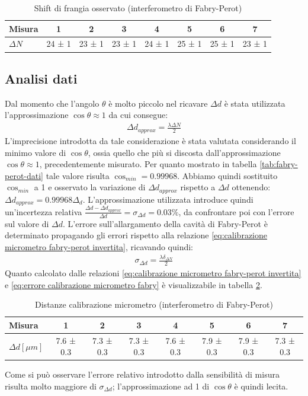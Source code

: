 \documentclass[a4paper]{article}
\begin{document}
\begin{table}[htbp]
\centering
\caption{Shift di frangia osservato (interferometro di Fabry-Perot)}
\begin{tabular}{|l|ccccccc|}
\hline
Misura & 1 & 2 & 3 & 4 & 5 & 6 & 7 \\\hline\hline
$\Delta N$ & 24 ± 1 & 23 ± 1 & 23 ± 1 & 24 ± 1 & 25 ± 1 & 25 ± 1 & 23 ± 1 \\\hline
\end{tabular}
\label{tab: micrometro fabry-perot}
\end{table}

\subsection{Analisi dati}
Dal momento che l'angolo $\theta$ è molto piccolo nel ricavare $\Delta d$ è stata utilizzata l'approssimazione $\cos{\theta}\approx1$ da cui consegue:
\begin{align}
    \Delta d_{approx} = \frac{\lambda \Delta N}{2}
\label{eq:calibrazione micrometro fabry-perot invertita}
\end{align}
L'imprecisione introdotta da tale considerazione è stata valutata considerando il minimo valore di $\cos{\theta}$, ossia quello che più si discosta dall'approssimazione $\cos{\theta}\approx1$, precedentemente misurato. Per quanto mostrato in tabella \ref{tab:fabry-perot-dati} tale valore risulta $\cos_{min}=0.99968$.
Abbiamo quindi sostituito $\cos_{min}$ a 1 e osservato la variazione di $\Delta d_{approx}$ rispetto a $\Delta d$ ottenendo: $\Delta d_{approx} = 0.99968\Delta_d$. L'approssimazione utilizzata introduce quindi un'incertezza relativa $\frac{\Delta d- \Delta d_{approx}}{\Delta d}=\sigma_{\Delta d}=0.03\%$, da confrontare poi con l'errore sul valore di $\Delta d$.
L'errore sull'allargamento della cavità di Fabry-Perot è determinato propagando gli errori rispetto alla relazione \ref{eq:calibrazione micrometro fabry-perot invertita}, ricavando quindi:
\begin{align}
   \sigma_{\Delta d}= \frac{\lambda \delta_{\Delta N}}{2}
\label{eq:errore calibrazione micrometro fabry}
\end{align}
Quanto calcolato dalle relazioni \ref{eq:calibrazione micrometro fabry-perot invertita} e \ref{eq:errore calibrazione micrometro fabry} è visualizzabile in tabella \ref{tab: distanze calibrazione fabry-perot}.
\begin{table}[htbp]
\centering
\caption{Distanze calibrazione micrometro (interferometro di Fabry-Perot)}
\begin{tabular}{|l|ccccccc|}
\hline
Misura & 1 & 2 & 3 & 4 & 5 & 6 & 7 \\\hline\hline
$\Delta d [\mu m]$ & 7.6 ± 0.3  & 7.3 ± 0.3  & 7.3 ± 0.3  & 7.6 ± 0.3  & 7.9 ± 0.3 & 7.9 ± 0.3 & 7.3 ± 0.3 \\\hline
\end{tabular}
\label{tab: distanze calibrazione fabry-perot}
\end{table}
Come si può osservare l'errore relativo introdotto dalla sensibilità di misura risulta molto maggiore di $\sigma_{\Delta d}$; l'approssimazione ad 1 di $\cos{\theta}$ è quindi lecita.
\end{document}
